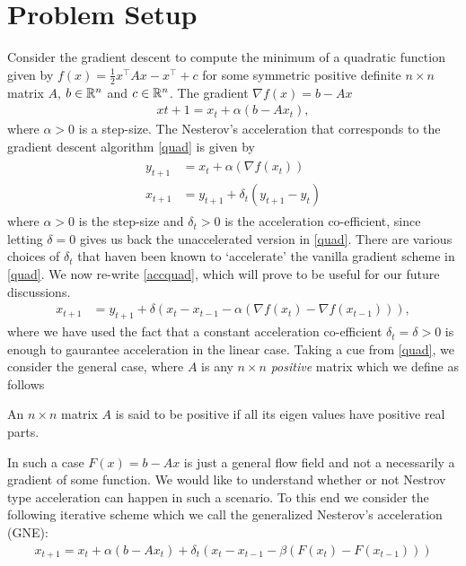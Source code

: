 \section{Problem Setup}
Consider the gradient descent to compute the minimum of a quadratic function given by $f(x)=\frac{1}{2}x^\top A x-x^\top +c$ for some symmetric positive definite $n\times n$ matrix $A$, $b\in \mathbb{R}^n$ and $c\in\mathbb{R}^n$. The gradient $\nabla f(x)=b-Ax$
\begin{align}\label{quad}
x{t+1}=x_t+\alpha (b-Ax_t),
\end{align}
where $\alpha>0$ is a step-size. The Nesterov's acceleration that corresponds to the gradient descent algorithm \eqref{quad} is given by
\begin{align}\label{accquad}
\begin{split}
y_{t+1}&=x_t+\alpha(\nabla f(x_t))\\
x_{t+1}&=y_{t+1}+\delta_t(y_{t+1}-y_{t})
\end{split}
\end{align}
where $\alpha>0$ is the step-size and $\delta_t>0$ is the acceleration co-efficient, since letting $\delta=0$ gives us back the unaccelerated version in \eqref{quad}. There are various choices of $\delta_t$ that haven been known to `accelerate' the vanilla gradient scheme in \eqref{quad}. We now re-write \eqref{accquad}, which will prove to be useful for our future discussions.
\begin{align}\label{accquadrw}
x_{t+1}&=y_{t+1}+\delta(x_{t}-x_{t-1}-\alpha(\nabla f(x_t)-\nabla f(x_{t-1}))),
\end{align}
where we have used the fact that a constant acceleration co-efficient $\delta_t=\delta>0$ is enough to gaurantee acceleration in the linear case.
Taking a cue from \eqref{quad}, we consider the general case, where $A$ is any $n\times n$ \emph{positive} matrix which we define as follows
\begin{assumption}\label{pos}
An $n\times n$ matrix $A$ is said to be positive if all its eigen values have positive real parts.
\end{assumption}
In such a case $F(x)=b-Ax$ is just a general flow field and not a necessarily a gradient of some function. We would like to understand whether or not Nestrov type acceleration can happen in such a scenario. To this end we consider the following iterative scheme which we call the generalized Nesterov's acceleration (GNE):
\begin{align}\label{accgen}
x_{t+1}=x_t+\alpha(b-Ax_t)+\delta_t (x_t-x_{t-1}-\beta(F(x_t)-F(x_{t-1})) )
\end{align}
